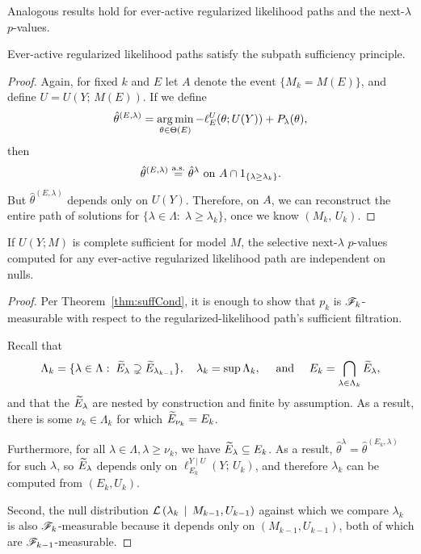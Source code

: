 \documentclass{article}
\begin{document}
Analogous results hold for ever-active regularized likelihood paths and the next-$\lambda$ $p$-values.

\begin{proposition}\label{prop:regPathSSP}
Ever-active regularized likelihood paths satisfy the
subpath sufficiency principle.
\end{proposition}

\begin{proof}
  Again, for fixed $k$ and $E$ let $A$ denote the event $\{M_k = M(E)\}$, and define $U=U(Y;\, M(E))$. If we define
\[
\hat\theta^{(E,\lambda)} = \operatorname*{arg\,min}_{\theta\in\Theta(E)} -\ell_E^{U}(\theta; U(Y)) + P_\lambda(\theta),
\]
then 
\[
\hat\theta^{(E,\lambda)} \overset{\textrm{a.s.}}{=} \hat\theta^{\lambda} \text{ on } 
A \cap 1_{\{\lambda \geq \lambda_k\}}.
\]
But $\hat\theta^{(E,\lambda)}$ depends only on $U(Y)$. Therefore, on $A$, we can reconstruct the entire path of solutions for $\{\lambda\in \Lambda:\; \lambda\geq \lambda_k\}$, once we know $(M_k,\,U_k)$.
\end{proof}

\begin{corollary}\label{cor:nextLambdaIndep}
  If $U(Y; M)$ is complete sufficient for model $M$, the selective next-$\lambda$ $p$-values computed for any ever-active regularized likelihood path are independent on nulls.
\end{corollary}
\begin{proof}
  Per Theorem~\ref{thm:suffCond}, it is enough to show that $p_k$ is $\mathscr{F}_k$-measurable with respect to the regularized-likelihood path's sufficient filtration.

  Recall that 
  \[
  \Lambda_k = \{\lambda\in \Lambda:\; \widetilde{E}_\lambda \supsetneq \widetilde{E}_{\lambda_{k-1}}\},
  \quad 
  \lambda_k = \sup\Lambda_k,
  \quad \text{ and } \quad
  E_k = \bigcap_{\lambda\in\Lambda_k} \widetilde{E}_{\lambda},
  \]
  and that the $\widetilde{E}_{\lambda}$ are nested by construction and finite by assumption. As a result, there is some $\nu_k\in \Lambda_k$ for which $\widetilde{E}_{\nu_k} = E_k$. 
  
  Furthermore, for all $\lambda\in\Lambda, \lambda\geq \nu_k$, we have $\widetilde{E}_\lambda \subseteq E_k$. As a result, ${\hat\theta^{\lambda} =\hat\theta^{(E_k,\lambda)}}$ for such $\lambda$, so $\widetilde{E}_{\lambda}$ depends only on $\ell_{E_k}^{Y\mid U}(Y;\, U_k)$, and therefore $\lambda_k$ can be computed from $(E_k, U_k)$.

  Second, the null distribution $\mathcal{L}\left(\lambda_k \,\mid\, M_{k-1}, U_{k-1}\right)$ against which we compare $\lambda_k$ is also $\mathscr{F}_k$-measurable because it depends only on $(M_{k-1}, U_{k-1})$, both of which are $\mathscr{F}_{k-1}$-measurable.
\end{proof}
\end{document}
